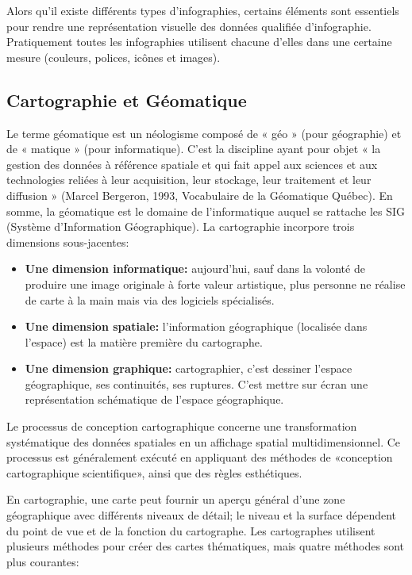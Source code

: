 \documentclass[french, a4paper, 12pt]{report}
\begin{document}
Alors qu'il existe différents types d'infographies, certains éléments sont essentiels pour rendre une représentation visuelle des données qualifiée d'infographie. Pratiquement toutes les infographies utilisent chacune d’elles dans une certaine mesure (couleurs, polices, icônes et images).

\subsection{Cartographie et Géomatique }
Le terme géomatique est un néologisme composé de « géo » (pour géographie) et de « matique » (pour informatique). C’est la discipline ayant pour objet « la gestion des données à référence spatiale et qui fait appel aux sciences et aux technologies reliées à leur acquisition, leur stockage, leur traitement et leur diffusion » (Marcel Bergeron, 1993, Vocabulaire de la Géomatique Québec). En somme, la géomatique est le domaine de l’informatique auquel se rattache les SIG (Système d’Information Géographique).
La cartographie incorpore trois dimensions sous-jacentes:

\begin{itemize}
\item \textbf{Une dimension informatique:}  aujourd’hui, sauf dans la volonté de produire une image originale à forte valeur artistique, plus personne ne réalise de carte à la main mais via des logiciels spécialisés. 
\item \textbf{Une dimension spatiale:}  l’information géographique (localisée dans l’espace) est la matière première du cartographe. 
\item \textbf{ Une dimension graphique:} cartographier, c’est dessiner l’espace géographique, ses continuités, ses ruptures. C’est mettre sur écran une représentation schématique de l’espace géographique.
\end{itemize} 
Le processus de conception cartographique concerne une transformation systématique des données spatiales en un affichage spatial multidimensionnel. Ce processus est généralement exécuté en appliquant des méthodes de «conception cartographique scientifique», ainsi que des règles esthétiques.

En cartographie, une carte peut fournir un aperçu général d’une zone géographique avec différents niveaux de détail; le niveau et la surface dépendent du point de vue et de la fonction du cartographe. Les cartographes utilisent plusieurs méthodes pour créer des cartes thématiques, mais quatre méthodes sont plus courantes:
\end{document}

